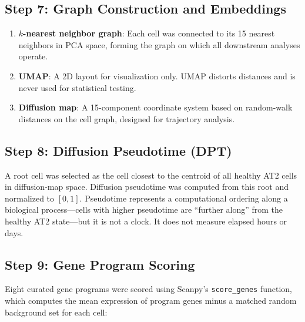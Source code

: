 \documentclass[11pt]{article}
\begin{document}
\subsection{Step 7: Graph Construction and Embeddings}

\begin{enumerate}
\item \textbf{$k$-nearest neighbor graph}: Each cell was connected to its 15 nearest neighbors in PCA space, forming the graph on which all downstream analyses operate.
\item \textbf{UMAP}: A 2D layout for visualization only. UMAP distorts distances and is never used for statistical testing.
\item \textbf{Diffusion map}: A 15-component coordinate system based on random-walk distances on the cell graph, designed for trajectory analysis.
\end{enumerate}

\subsection{Step 8: Diffusion Pseudotime (DPT)}

A root cell was selected as the cell closest to the centroid of all healthy AT2 cells in diffusion-map space. Diffusion pseudotime was computed from this root and normalized to $[0,1]$. Pseudotime represents a computational ordering along a biological process---cells with higher pseudotime are ``further along'' from the healthy AT2 state---but it is not a clock. It does not measure elapsed hours or days.

\subsection{Step 9: Gene Program Scoring}

Eight curated gene programs were scored using Scanpy's \texttt{score\_genes} function, which computes the mean expression of program genes minus a matched random background set for each cell:
\end{document}
